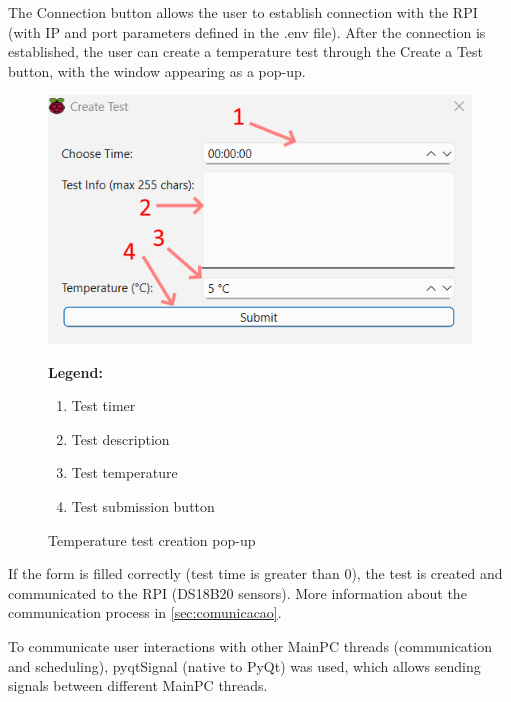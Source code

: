 The Connection button allows the user to establish connection with the RPI (with IP and port parameters defined in the .env file). After the connection is established, the user can create a temperature test through the Create a Test button, with the window appearing as a pop-up.

\begin{figure}[H]
    \centering
    \begin{minipage}{0.6\textwidth}
        \includegraphics[width=\linewidth]{figures/gui_2.png}
    \end{minipage}%
    \hfill
    \begin{minipage}{0.35\textwidth}
        \small
        \textbf{Legend:}
        \begin{enumerate}
            \item Test timer
            \item Test description
            \item Test temperature
            \item Test submission button
        \end{enumerate}
    \end{minipage}
    \caption{Temperature test creation pop-up}
    \label{fig:gui_2}
\end{figure}

If the form is filled correctly (test time is greater than 0), the test is created and communicated to the RPI (DS18B20 sensors). More information about the communication process in \autoref{sec:comunicacao}.

To communicate user interactions with other MainPC threads (communication and scheduling), pyqtSignal (native to PyQt) was used, which allows sending signals between different MainPC threads.

